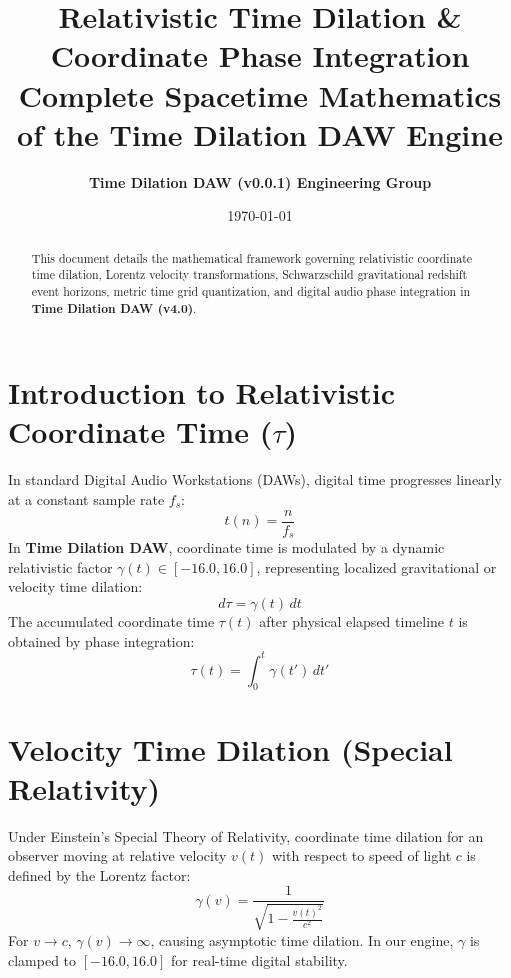 \documentclass[11pt,a4paper]{article}
\title{\textbf{\Huge Relativistic Time Dilation \& Coordinate Phase Integration}\\[0.5em]
\Large Complete Spacetime Mathematics of the Time Dilation DAW Engine}
\author{\textbf{Time Dilation DAW (v0.0.1) Engineering Group}}
\date{\today}
\begin{document}
\maketitle

\begin{abstract}
This document details the mathematical framework governing relativistic coordinate time dilation, Lorentz velocity transformations, Schwarzschild gravitational redshift event horizons, metric time grid quantization, and digital audio phase integration in \textbf{Time Dilation DAW (v4.0)}.
\end{abstract}

\section{Introduction to Relativistic Coordinate Time ($\tau$)}
In standard Digital Audio Workstations (DAWs), digital time progresses linearly at a constant sample rate $f_s$:
\begin{equation}
t(n) = \frac{n}{f_s}
\end{equation}
In \textbf{Time Dilation DAW}, coordinate time is modulated by a dynamic relativistic factor $\gamma(t) \in [-16.0, 16.0]$, representing localized gravitational or velocity time dilation:
\begin{equation}
d\tau = \gamma(t) \, dt
\end{equation}
The accumulated coordinate time $\tau(t)$ after physical elapsed timeline $t$ is obtained by phase integration:
\begin{equation}
\tau(t) = \int_0^t \gamma(t') \, dt'
\end{equation}

\section{Velocity Time Dilation (Special Relativity)}
Under Einstein's Special Theory of Relativity, coordinate time dilation for an observer moving at relative velocity $v(t)$ with respect to speed of light $c$ is defined by the Lorentz factor:
\begin{equation}
\gamma(v) = \frac{1}{\sqrt{1 - \frac{v(t)^2}{c^2}}}
\end{equation}
For $v \to c$, $\gamma(v) \to \infty$, causing asymptotic time dilation. In our engine, $\gamma$ is clamped to $[-16.0, 16.0]$ for real-time digital stability.
\end{document}
